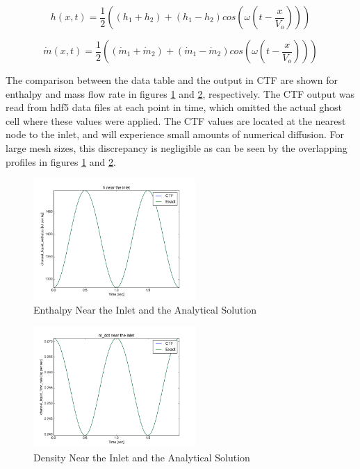 \documentclass{mc2015}
\begin{document}
\begin{equation}
	\label{eq:Sine_Wave:h}
	h(x,t) = \frac{1}{2} \left( 
			(h_{1}+h_{2}) + (h_{1}-h_{2}) cos\left(
				\omega \left( t - \frac{x}{V_{o}} \right)
				\right)
			\right)
\end{equation}

\begin{equation}
	\label{eq:Sine_Wave:m_dot}
	\dot{m}(x,t) = \frac{1}{2} \left( 
			(\dot{m}_{1}+\dot{m}_{2}) + (\dot{m}_{1}-\dot{m}_{2}) cos\left(
				\omega \left( t - \frac{x}{V_{o}} \right)
				\right)
			\right)
\end{equation}


The comparison between the data table and the output in CTF are shown for
enthalpy and mass flow rate in figures \ref{fig:Inlet_h} and
\ref{fig:Inlet_m_dot}, respectively. The CTF output was read from hdf5 data
files at each point in time, which omitted the actual ghost cell where these values
were applied. The CTF values are located at the nearest node to the inlet, and
will experience small amounts of numerical diffusion. For large mesh sizes, this
discrepancy is negligible as can be seen by the overlapping profiles in figures
\ref{fig:Inlet_h} and \ref{fig:Inlet_m_dot}.

\begin{figure}[!h]
	\centering
	\includegraphics[width=0.55\textwidth]{images/Code_Verification/run_00_00/residual/results/Inlet_h}
	\caption{Enthalpy Near the Inlet and the Analytical Solution}
	\label{fig:Inlet_h}
\end{figure}

\begin{figure}[!h]
	\centering
	\includegraphics[width=0.55\textwidth]{images/Code_Verification/run_00_00/residual/results/Inlet_m_dot}
	\caption{Density Near the Inlet and the Analytical Solution}
	\label{fig:Inlet_m_dot}
\end{figure}
\end{document}
